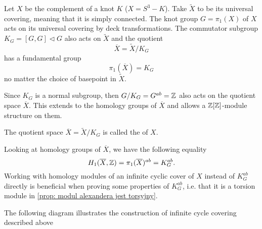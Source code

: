 Let $X$ be the complement of a knot $K$ ($X=S^3-K$). Take $\widetilde{X}$ to be its universal covering, meaning that it is simply connected. 
The knot group $G=\pi_1(X)$ of $X$ acts on its universal covering by deck transformations. 
The commutator subgroup $K_G=[G, G]\triangleleft G$ also acts on $\widetilde{X}$ and the quotient 
$$\overline{X}=\widetilde{X}/K_G$$ 
has a fundamental group 
$$\pi_1(\overline{X})=K_G$$
no matter the choice of basepoint in $\widetilde{X}$.

Since $K_G$ is a normal subgroup, then $G/K_G=G^{ab}=\operatorname{\mathbb{Z}}$ also acts on the quotient space $\overline{X}$. This extends to the homology groups of $\overline{X}$ and allows a $\operatorname{\mathbb{Z}}[\operatorname{\mathbb{Z}}]$-module structure on them.

\begin{definition}\label{inf cyclic cover}
  The quotient space {\boldmath$\overline{X}=\widetilde{X}/K_G$} is called the  of $X$.
\end{definition}

Looking at homology groups of $\overline{X}$, we have the following equality
$$H_1(\overline{X}, \operatorname{\mathbb{Z}})=\pi_1(\overline{X})^{ab}=K_G^{ab}.$$
Working with homology modules of an infinite cyclic cover of $X$ instead of $K_G^{ab}$ directly is beneficial when proving some properties of $K_G^{ab}$, i.e. that it is a torsion module in \cref{prop: modul alexandera jest torsyjny}. 

The following diagram illustrates the construction of infinite cycle covering described above

\def\actson{
  \begin{tikzpicture}[baseline]
    \draw[->](0, 0) arc (-120:180:.5em);
  \end{tikzpicture}
}

\begin{center}
\end{center}

%

